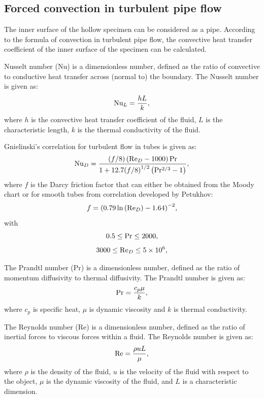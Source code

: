 \documentclass[preprint,5p,twocolumn,11pt,sort&compress]{elsarticle}
\begin{document}
\subsection{Forced convection in turbulent pipe flow}
The inner surface of the hollow specimen can be considered as a pipe.
According to the formula of convection in turbulent pipe flow, the convective heat transfer coefficient of the inner surface of the specimen can be calculated.

Nusselt number (Nu) is a dimensionless number, defined as the ratio of convective to conductive heat transfer across (normal to) the boundary.
The Nusselt number is given as:
\[{\rm{N}}{{\rm{u}}_L} = \frac{{hL}}{k},\]
where $h$ is the convective heat transfer coefficient of the fluid, $L$ is the characteristic length, $k$ is the thermal conductivity of the fluid.

Gnielinski's correlation for turbulent flow in tubes is given as:
\[{\rm{N}}{{\rm{u}}_D} = \frac{{\left( {f/8} \right)\left( {{\rm{R}}{{\rm{e}}_D} - 1000} \right){\rm{Pr}}}}{{1 + 12.7{{(f/8)}^{1/2}}\left( {{\rm{P}}{{\rm{r}}^{2/3}} - 1} \right)}},\]
where $f$ is the Darcy friction factor that can either be obtained from the Moody chart or for smooth tubes from correlation developed by Petukhov:
\[f = {\left( {0.79\ln \left( {{\rm{R}}{{\rm{e}}_D}} \right) - 1.64} \right)^{ - 2}},\]
with
\[0.5 \le {\rm{Pr}} \le 2000,\]
\[3000 \le {\rm{R}}{{\rm{e}}_D} \le 5 \times {10^6},\]

The Prandtl number (Pr) is a dimensionless number, defined as the ratio of momentum diffusivity to thermal diffusivity.
The Prandtl number is given as:
\[{\rm{Pr}} = \frac{{{c_p}\mu }}{k},\]
where
$c_{p}$ is specific heat, $\mu$ is dynamic viscosity and $k$ is thermal conductivity.

The Reynolds number (Re) is a dimensionless number, defined as the ratio of inertial forces to viscous forces within a fluid.
The Reynolds number is given as:
\[{\rm{Re}} = \frac{{\rho uL}}{\mu },\]
where
$\rho$ is the density of the fluid, $u$ is the velocity of the fluid with respect to the object, $\mu$ is the dynamic viscosity of the fluid, and $L$ is a characteristic dimension.
\end{document}
